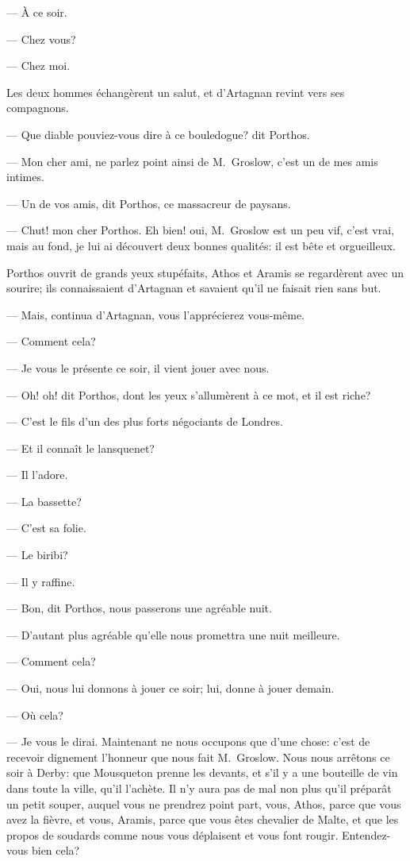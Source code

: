— À ce soir.

— Chez vous?

— Chez moi.

Les deux hommes échangèrent un salut, et d'Artagnan revint vers ses compagnons.

— Que diable pouviez-vous dire à ce bouledogue? dit Porthos.

— Mon cher ami, ne parlez point ainsi de M.~Groslow, c'est un de mes amis intimes.

— Un de vos amis, dit Porthos, ce massacreur de paysans.

— Chut! mon cher Porthos. Eh bien! oui, M.~Groslow est un peu vif, c'est vrai, mais au fond, je lui ai découvert deux bonnes qualités: il est bête et orgueilleux.

Porthos ouvrit de grands yeux stupéfaits, Athos et Aramis se regardèrent avec un sourire; ils connaissaient d'Artagnan et savaient qu'il ne faisait rien sans but.

— Mais, continua d'Artagnan, vous l'apprécierez vous-même.

— Comment cela?

— Je vous le présente ce soir, il vient jouer avec nous.

— Oh! oh! dit Porthos, dont les yeux s'allumèrent à ce mot, et il est riche?

— C'est le fils d'un des plus forts négociants de Londres.

— Et il connaît le lansquenet?

— Il l'adore.

— La bassette?

— C'est sa folie.

— Le biribi?

— Il y raffine.

— Bon, dit Porthos, nous passerons une agréable nuit.

— D'autant plus agréable qu'elle nous promettra une nuit meilleure.

— Comment cela?

— Oui, nous lui donnons à jouer ce soir; lui, donne à jouer demain.

— Où cela?

— Je vous le dirai. Maintenant ne nous occupons que d'une chose: c'est de recevoir dignement l'honneur que nous fait M.~Groslow. Nous nous arrêtons ce soir à Derby: que Mousqueton prenne les devants, et s'il y a une bouteille de vin dans toute la ville, qu'il l'achète. Il n'y aura pas de mal non plus qu'il préparât un petit souper, auquel vous ne prendrez point part, vous, Athos, parce que vous avez la fièvre, et vous, Aramis, parce que vous êtes chevalier de Malte, et que les propos de soudards comme nous vous déplaisent et vous font rougir. Entendez-vous bien cela?

